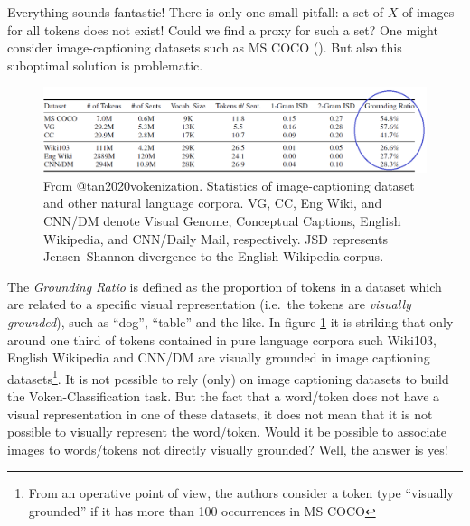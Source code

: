 \documentclass[
]{krantz}
\begin{document}
Everything sounds fantastic! There is only one small pitfall: a set of \(X\) of images for all tokens does not exist! Could we find a proxy for such a set? One might consider image-captioning datasets such as MS COCO (\citet{lin2014microsoft}). But also this suboptimal solution is problematic.

\begin{figure}

{\centering \includegraphics[width=1\linewidth]{figures/02-03-img-support-text/img-tan2020-01} 

}

\caption{From @tan2020vokenization. Statistics of image-captioning dataset and other natural language corpora. VG, CC, Eng Wiki, and CNN/DM denote Visual Genome, Conceptual Captions, English Wikipedia, and CNN/Daily Mail, respectively. JSD represents Jensen–Shannon divergence to the English Wikipedia corpus.}\label{fig:img-tan2020-01}
\end{figure}

The \emph{Grounding Ratio} is defined as the proportion of tokens in a dataset which are related to a specific visual representation (i.e.~the tokens are \emph{visually grounded}), such as ``dog'', ``table'' and the like. In figure \ref{fig:img-tan2020-01} it is striking that only around one third of tokens contained in pure language corpora such Wiki103, English Wikipedia and CNN/DM are visually grounded in image captioning datasets\footnote{From an operative point of view, the authors consider a token type ``visually grounded'' if it has more than 100 occurrences in MS COCO}. It is not possible to rely (only) on image captioning datasets to build the Voken-Classification task. But the fact that a word/token does not have a visual representation in one of these datasets, it does not mean that it is not possible to visually represent the word/token. Would it be possible to associate images to words/tokens not directly visually grounded? Well, the answer is yes!
\end{document}
